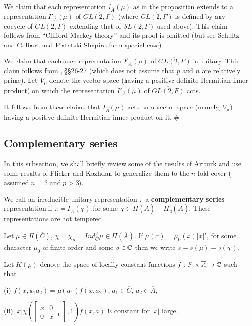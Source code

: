 \documentclass[twocolumn,10pt]{article}
\begin{document}
We claim that each representation
$I_{\overline{A}}(\mu )$ as in the proposition
extends to a representation $I'_{\overline{A}}(\mu )$
of $\overline{GL(2,F)}$ (where
$\overline{GL(2,F)}$ is defined by any cocycle of
$GL(2,F)$ extending that of $\overline{SL(2,F)}$
used above). This claim follows from ``Clifford-Mackey theory''
and its proof is omitted (but see Schultz \cite{Sch} and
Gelbart and Piatetski-Shapiro \cite{GPS}
for a special case).

We claim that each such representation
$I'_{\overline{A}}(\mu )$ of $\overline{GL(2,F)}$
is unitary. This claim follows from
\cite{FK}, \S\S 26-27 (which does not assume that
$p$ and $n$ are relatively prime). Let $V_\mu$ denote the
vector space (having a positive-definite Hermitian inner product)
on which the representation $I'_{\overline{A}}(\mu )$ 
of $\overline{GL(2,F)}$ acts.

It follows from these claims that 
$I_{\overline{A}}(\mu )$ acts on a vector space (namely, $V_\mu$)
having a positive-definite Hermitian inner product on it.
$\#$

\subsection{Complementary series}

In this subsection, we shall briefly
review some of the results of Ariturk \cite{Ar}
and use some results of Flicker and Kazhdan \cite{FK}
to generalize them to the $n$-fold cover (\cite{Ar}
assumed $n=3$ and $p>3$).

We call an irreducible unitary representation
$\pi $ a {\bf complementary series} representation if 
$\pi =I_{\overline{A}}(\chi )$ 
for some 
$\chi \in \Pi (\overline{A})-\Pi _u(\overline{A})$. 
These representations are not
tempered.

Let $\mu \in \Pi (\overline{C})$,
$\chi=\chi_\mu =Ind_{\overline{C}}^{\overline{A}}\mu \in
\Pi (\overline{A})$. If $\mu (x)=\mu _0(x)|x|^s$, for some
character $\mu _0$ of finite order and some 
$s\in {\Bbb C}$ then
we write $s=s(\mu )=s(\chi )$.

Let $K(\mu )$ denote the space of locally constant 
functions $f:F\times 
\overline{A}\rightarrow {\Bbb C}$ such that

(i) $f(x,a_1a_2)=\mu (a_1)f(x,a_2)$, 
$a_1\in \overline{C}$, $a_2\in 
\overline{A}$,

(ii) $|x|\chi (\left[ 
\begin{array}{cc}
x & 0 \\ 
0 & x^{-1}
\end{array}
\right] ,1)f(x,a)$ is constant for $|x|$ large.
\end{document}
